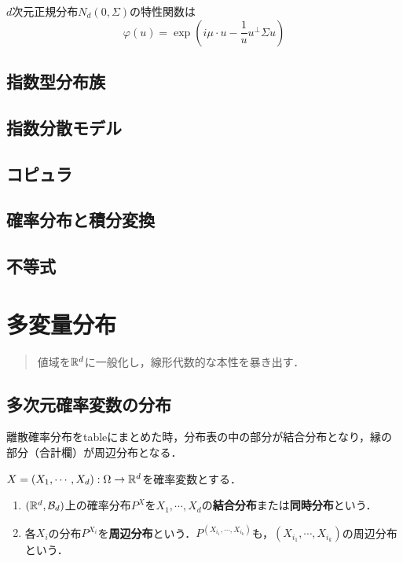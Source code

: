 \documentclass[uplatex,dvipdfmx]{jsreport}
\begin{document}
\begin{proposition}
    $d$次元正規分布$N_d(0,\Sigma)$の特性関数は
    \[\varphi(u)=\exp(i\mu\cdot u-\frac{1}{u}u^\perp\Sigma u)\]
\end{proposition}

\section{指数型分布族}

\section{指数分散モデル}

\section{コピュラ}

\section{確率分布と積分変換}

\section{不等式}

\chapter{多変量分布}

\begin{quotation}
    値域を$\mathbb{R}^d$に一般化し，線形代数的な本性を暴き出す．
\end{quotation}

\section{多次元確率変数の分布}

\begin{tcolorbox}[colframe=ForestGreen, colback=ForestGreen!10!white,breakable,colbacktitle=ForestGreen!40!white,coltitle=black,fonttitle=\bfseries\sffamily,
title=]
    離散確率分布をtableにまとめた時，分布表の中の部分が結合分布となり，縁の部分（合計欄）が周辺分布となる．
\end{tcolorbox}

\begin{definition}
    $X=(X_1,\cdots,X_d):\Omega\to\mathbb{R}^d$を確率変数とする．
    \begin{enumerate}
        \item $(\mathbb{R}^d,\mathcal{B}_d)$上の確率分布$P^X$を$X_1,\cdots,X_d$の\textbf{結合分布}または\textbf{同時分布}という．
        \item 各$X_i$の分布$P^{X_i}$を\textbf{周辺分布}という．$P^{(X_{i_1},\cdots,X_{i_k})}$も，$(X_{i_1},\cdots,X_{i_k})$の周辺分布という．
    \end{enumerate}
\end{definition}
\end{document}
